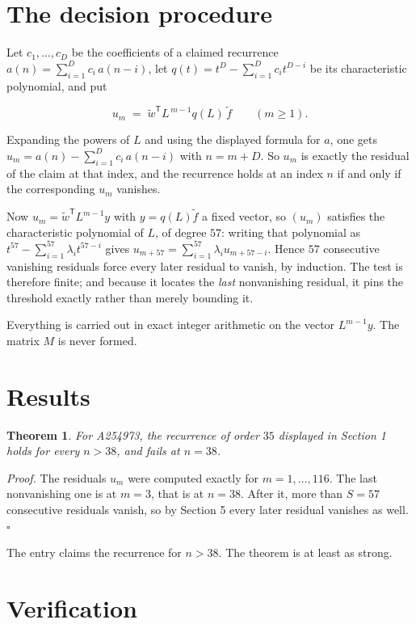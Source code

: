 \documentclass[11pt]{article}
\newtheorem{theorem}{Theorem}
\theoremstyle{definition}
\begin{document}
\section{The decision procedure}

Let $c_1,\dots,c_D$ be the coefficients of a claimed recurrence $a(n) = \sum_{i=1}^{D} c_i\,a(n-i)$, let $q(t) = t^{D} - \sum_{i=1}^{D} c_i t^{D-i}$ be its characteristic polynomial, and put

\[u_m \;=\; \tilde w^{\mathsf T} L^{\,m-1} q(L)\,\tilde f \qquad (m \ge 1).\]

Expanding the powers of $L$ and using the displayed formula for $a$, one gets $u_m = a(n) - \sum_{i=1}^{D} c_i\,a(n-i)$ with $n = m + D$. So $u_m$ is exactly the residual of the claim at that index, and the recurrence holds at an index $n$ if and only if the corresponding $u_m$ vanishes.

Now $u_m = \tilde w^{\mathsf T} L^{m-1} y$ with $y = q(L)\tilde f$ a fixed vector, so $(u_m)$ satisfies the characteristic polynomial of $L$, of degree $57$: writing that polynomial as $t^{57} - \sum_{i=1}^{57} \lambda_i t^{57-i}$ gives $u_{m+57} = \sum_{i=1}^{57} \lambda_i u_{m+57-i}$. Hence $57$ consecutive vanishing residuals force every later residual to vanish, by induction. The test is therefore finite; and because it locates the {\itshape last} nonvanishing residual, it pins the threshold exactly rather than merely bounding it.

Everything is carried out in exact integer arithmetic on the vector $L^{m-1}y$. The matrix $M$ is never formed.

\section{Results}

\begin{theorem} For A254973, the recurrence of order $35$ displayed in Section 1 holds for every $n > 38$, and fails at $n = 38$.\end{theorem}

{\itshape Proof.} The residuals $u_m$ were computed exactly for $m = 1,\dots,116$. The last nonvanishing one is at $m = 3$, that is at $n = 38$. After it, more than $S = 57$ consecutive residuals vanish, so by Section 5 every later residual vanishes as well. $\square$

The entry claims the recurrence for $n > 38$. The theorem is at least as strong.

\section{Verification}
\end{document}
